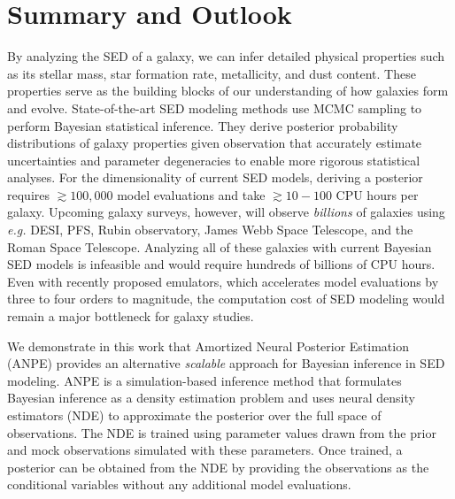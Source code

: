 \section{Summary and Outlook} \label{sec:summary}
By analyzing the SED of a galaxy, we can infer detailed physical properties
such as its stellar mass, star formation rate, metallicity, and dust content. 
These properties serve as the building blocks of our understanding of how
galaxies form and evolve. 
State-of-the-art SED modeling methods use MCMC sampling to perform Bayesian
statistical inference. 
They derive posterior probability distributions of galaxy properties given
observation that accurately estimate uncertainties and parameter degeneracies
to enable more rigorous statistical analyses. 
For the dimensionality of current SED models, deriving a posterior requires 
${\gtrsim}100,000$ model evaluations and take ${\gtrsim}10-100$ CPU hours per 
galaxy. 
Upcoming galaxy surveys, however, will observe \emph{billions} of galaxies
using \emph{e.g.} DESI, PFS, Rubin observatory, James Webb Space Telescope, and
the Roman Space Telescope. 
Analyzing all of these galaxies with current Bayesian SED models is infeasible
and would require hundreds of billions of CPU hours.
Even with recently proposed emulators, which accelerates model evaluations 
by three to four orders to magnitude, the computation cost of SED modeling
would remain a major bottleneck for galaxy studies. 

We demonstrate in this work that Amortized Neural Posterior Estimation (ANPE)
provides an alternative \emph{scalable} approach for Bayesian inference in SED
modeling.
ANPE is a simulation-based inference method that formulates Bayesian inference
as a density estimation problem and uses neural density estimators (NDE) to
approximate the posterior over the full space of observations. 
The NDE is trained using parameter values drawn from the prior and mock
observations simulated with these parameters.  
Once trained, a posterior can be obtained from the NDE by providing the
observations as the conditional variables without any additional model
evaluations. 

